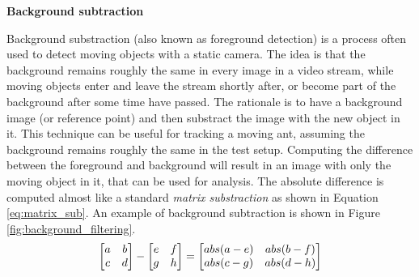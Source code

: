 \noindent \textbf{Background subtraction} \par
Background substraction (also known as foreground detection) is a process often used to detect moving objects with a static camera\cite{theory1}. The idea is that the background remains roughly the same in every image in a video stream, while moving objects enter and leave the stream shortly after, or become part of the background after some time have passed. The rationale is to have a background image (or reference point) and then substract the image with the new object in it. This technique can be useful for tracking a moving ant, assuming the background remains roughly the same in the test setup. Computing the difference between the foreground and background will result in an image with only the moving object in it, that can be used for analysis. The absolute difference is computed almost like a standard \textit{matrix substraction} as shown in Equation \ref{eq:matrix_sub}. An example of background subtraction is shown in Figure \ref{fig:background_filtering}.\\

\begin{equation}
\setlength{\arraycolsep}{5pt}
 \begin{bmatrix}
  a & b \\
  c & d \\
 \end{bmatrix} - 
 \setlength{\arraycolsep}{5pt} 
 \begin{bmatrix}
  e & f \\
  g & h \\
 \end{bmatrix} =
 \setlength{\arraycolsep}{5pt} 
 \begin{bmatrix}
  abs(a-e) & abs(b-f) \\
  abs(c-g) & abs(d-h) \\
 \end{bmatrix}
 \label{eq:matrix_sub}
\end{equation}

